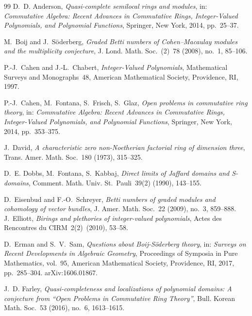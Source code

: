 \documentclass[11pt,reqno]{amsart}
\numberwithin{equation}{section}
\theoremstyle{definition}
\begin{document}
\begin{thebibliography}{99}
D.~D. Anderson, \emph{Quasi-complete semilocal rings and modules},
in: \emph{Commutative Algebra: Recent Advances in Commutative Rings,
Integer-Valued Polynomials, and Polynomial Functions},
Springer, New York, 2014, pp.~25--37.

M.~Boij and J.~S\"oderberg,
\emph{Graded Betti numbers of Cohen--Macaulay modules and the
multiplicity conjecture},
J. Lond. Math. Soc.~(2)~78 (2008), no.~1, 85--106.

P.-J.~Cahen and J.-L.~Chabert,
\emph{Integer-Valued Polynomials},
Mathematical Surveys and Monographs~48,
American Mathematical Society, Providence, RI, 1997.

P.-J.~Cahen, M.~Fontana, S.~Frisch, S.~Glaz,
\emph{Open problems in commutative ring theory},
in: \emph{Commutative Algebra: Recent Advances in Commutative Rings,
Integer-Valued Polynomials, and Polynomial Functions},
Springer, New York, 2014, pp.~353--375.

J.~David, \emph{A characteristic zero non-Noetherian factorial ring of
dimension three}, Trans. Amer. Math. Soc.~180 (1973), 315--325.

D.~E. Dobbs, M.~Fontana, S.~Kabbaj, \emph{Direct limits of Jaffard
domains and S-domains}, Comment. Math. Univ. St.~Pauli~39(2) (1990),
143--155.

D.~Eisenbud and F.-O.~Schreyer,
\emph{Betti numbers of graded modules and cohomology of vector
bundles},
J. Amer. Math. Soc.~22 (2009), no.~3, 859--888.
J.~Elliott, \emph{Birings and plethories of integer-valued polynomials},
Actes des Rencontres du CIRM~2(2)~(2010), 53--58.

D.~Erman and S.~V.~Sam,
\emph{Questions about Boij-S\"oderberg theory},
in: \emph{Surveys on Recent Developments in Algebraic Geometry},
Proceedings of Symposia in Pure Mathematics, vol.~95,
American Mathematical Society, Providence, RI, 2017, pp.~285--304.
arXiv:1606.01867.

J.~D. Farley, \emph{Quasi-completeness and localizations of polynomial
domains: A conjecture from ``Open Problems in Commutative Ring Theory''},
Bull. Korean Math. Soc.~53 (2016), no.~6, 1613--1615.


\end{thebibliography}
\end{document}

